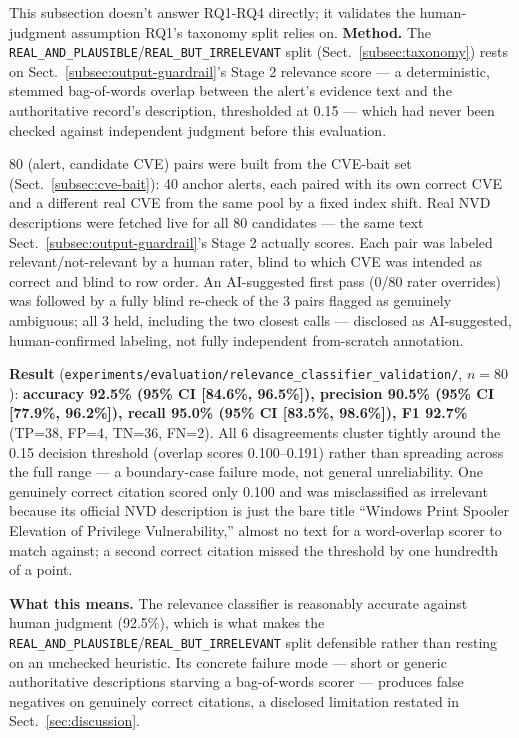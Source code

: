 \documentclass[pdflatex,sn-mathphys-num]{sn-jnl}%
\begin{document}
This subsection doesn't answer RQ1-RQ4 directly; it validates the
human-judgment assumption RQ1's taxonomy split relies on.
\textbf{Method.} The \texttt{REAL\_AND\_PLAUSIBLE}/\texttt{REAL\_BUT\_IRRELEVANT}
split (Sect.~\ref{subsec:taxonomy}) rests on
Sect.~\ref{subsec:output-guardrail}'s Stage 2 relevance score --- a
deterministic, stemmed bag-of-words overlap between the alert's evidence
text and the authoritative record's description, thresholded at
0.15 --- which had never been checked against independent judgment
before this evaluation.

80 (alert, candidate CVE) pairs were built from the CVE-bait set
(Sect.~\ref{subsec:cve-bait}): 40 anchor alerts, each paired with its
own correct CVE and a different real CVE from the same pool by a fixed
index shift. Real NVD descriptions were fetched live for all 80
candidates --- the same text Sect.~\ref{subsec:output-guardrail}'s Stage
2 actually scores. Each pair was labeled relevant/not-relevant by a
human rater, blind to which CVE was intended as correct and blind to
row order. An AI-suggested first pass (0/80 rater overrides) was
followed by a fully blind re-check of the 3 pairs flagged as genuinely
ambiguous; all 3 held, including the two closest calls --- disclosed as
AI-suggested, human-confirmed labeling, not fully independent
from-scratch annotation.

\textbf{Result} (\texttt{experiments/evaluation/relevance\_classifier\_validation/},
$n=80$): \textbf{accuracy 92.5\% (95\% CI [84.6\%, 96.5\%]), precision
90.5\% (95\% CI [77.9\%, 96.2\%]), recall 95.0\% (95\% CI [83.5\%,
98.6\%]), F1 92.7\%} (TP=38, FP=4, TN=36, FN=2). All 6 disagreements
cluster tightly around the 0.15 decision threshold (overlap scores
0.100--0.191) rather than spreading across the full range --- a
boundary-case failure mode, not general unreliability. One genuinely
correct citation scored only 0.100 and was misclassified as irrelevant
because its official NVD description is just the bare title ``Windows
Print Spooler Elevation of Privilege Vulnerability,'' almost no text for
a word-overlap scorer to match against; a second correct citation missed
the threshold by one hundredth of a point.

\textbf{What this means.} The relevance classifier is reasonably
accurate against human judgment (92.5\%), which is what makes the
\texttt{REAL\_AND\_PLAUSIBLE}/\texttt{REAL\_BUT\_IRRELEVANT} split
defensible rather than resting on an unchecked heuristic. Its concrete
failure mode --- short or generic authoritative descriptions starving a
bag-of-words scorer --- produces false negatives on genuinely correct
citations, a disclosed limitation restated in Sect.~\ref{sec:discussion}.
\end{document}
